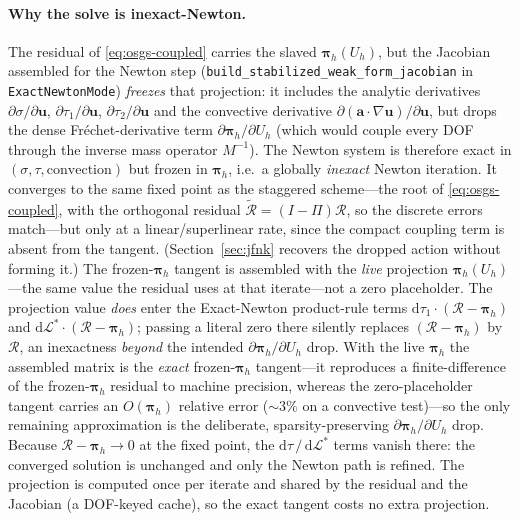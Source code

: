 \documentclass{article}
\newcommand{\code}[1]{\texttt{\small #1}}
\begin{document}
\paragraph{Why the solve is inexact-Newton.}  The residual of
\eqref{eq:osgs-coupled} carries the slaved $\boldsymbol{\pi}_h(U_h)$, but
the Jacobian assembled for the Newton step (\code{build\_stabilized\_weak\_form\_jacobian}
in \code{ExactNewtonMode}) \emph{freezes} that projection: it includes
the analytic derivatives $\partial\sigma/\partial\boldsymbol{u}$,
$\partial\tau_1/\partial\boldsymbol{u}$,
$\partial\tau_2/\partial\boldsymbol{u}$ and the convective derivative
$\partial(\boldsymbol{a}\cdot\nabla\boldsymbol{u})/\partial\boldsymbol{u}$,
but drops the dense Fr\'echet-derivative term
$\partial\boldsymbol{\pi}_h/\partial U_h$ (which would couple every DOF
through the inverse mass operator $M^{-1}$). The Newton system is
therefore exact in $(\sigma, \tau, \text{convection})$ but frozen in
$\boldsymbol{\pi}_h$, i.e.\ a globally \emph{inexact} Newton iteration.
It converges to the same fixed point as the staggered scheme---the root
of \eqref{eq:osgs-coupled}, with the orthogonal residual
$\widetilde{\mathcal{R}} = (I - \Pi)\mathcal{R}$, so the discrete errors
match---but only at a linear/superlinear rate, since the compact coupling
term is absent from the tangent. (Section~\ref{sec:jfnk} recovers the
dropped action without forming it.) The frozen-$\boldsymbol{\pi}_h$ tangent
is assembled with the \emph{live} projection $\boldsymbol{\pi}_h(U_h)$---the
same value the residual uses at that iterate---not a zero placeholder. The
projection value \emph{does} enter the Exact-Newton product-rule terms
$\mathrm{d}\tau_1\cdot(\mathcal{R}-\boldsymbol{\pi}_h)$ and
$\mathrm{d}\mathcal{L}^{*}\cdot(\mathcal{R}-\boldsymbol{\pi}_h)$; passing a
literal zero there silently replaces $(\mathcal{R}-\boldsymbol{\pi}_h)$ by
$\mathcal{R}$, an inexactness \emph{beyond} the intended
$\partial\boldsymbol{\pi}_h/\partial U_h$ drop. With the live
$\boldsymbol{\pi}_h$ the assembled matrix is the \emph{exact}
frozen-$\boldsymbol{\pi}_h$ tangent---it reproduces a finite-difference of the
frozen-$\boldsymbol{\pi}_h$ residual to machine precision, whereas the
zero-placeholder tangent carries an $O(\boldsymbol{\pi}_h)$ relative error
($\sim\!3\%$ on a convective test)---so the only remaining approximation is
the deliberate, sparsity-preserving $\partial\boldsymbol{\pi}_h/\partial U_h$
drop. Because $\mathcal{R}-\boldsymbol{\pi}_h\to 0$ at the fixed point, the
$\mathrm{d}\tau\,/\,\mathrm{d}\mathcal{L}^{*}$ terms vanish there: the
converged solution is unchanged and only the Newton path is refined. The
projection is computed once per iterate and shared by the residual and the
Jacobian (a DOF-keyed cache), so the exact tangent costs no extra projection.
\end{document}
